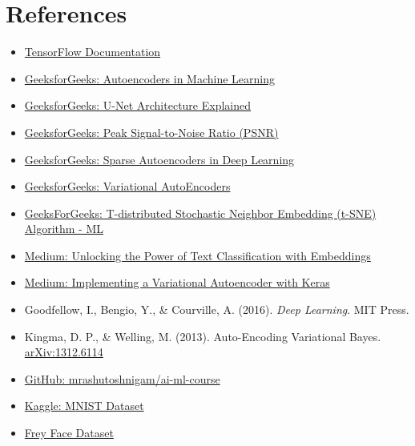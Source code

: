 \documentclass[12pt]{article}
\begin{document}
	\section{References}
	\begin{itemize}
		\item \href{https://www.tensorflow.org}{TensorFlow Documentation}
		\item \href{https://www.geeksforgeeks.org/machine-learning/auto-encoders/}{GeeksforGeeks: Autoencoders in Machine Learning}
		\item 
		\href{https://www.geeksforgeeks.org/machine-learning/u-net-architecture-explained/}{GeeksforGeeks: U-Net Architecture Explained}
		\item 
		\href{https://www.geeksforgeeks.org/python/python-peak-signal-to-noise-ratio-psnr/}{GeeksforGeeks: Peak Signal-to-Noise Ratio (PSNR)}
		\item 
		\href{https://www.geeksforgeeks.org/deep-learning/sparse-autoencoders-in-deep-learning/}{GeeksforGeeks: Sparse Autoencoders in Deep Learning}
		\item 
		\href{https://www.geeksforgeeks.org/machine-learning/variational-autoencoders/}{GeeksforGeeks: Variational AutoEncoders}
		\item 
		\href{https://www.geeksforgeeks.org/machine-learning/ml-t-distributed-stochastic-neighbor-embedding-t-sne-algorithm/}{GeeksForGeeks: T-distributed Stochastic Neighbor Embedding (t-SNE) Algorithm - ML}
		\item
		\href{https://medium.com/@juanc.olamendy/unlocking-the-power-of-text-classification-with-embeddings-7bcbb5912790}{Medium: Unlocking the Power of Text Classification with Embeddings}
		\item \href{https://medium.com/h7w/implementing-a-variational-autoencoder-with-keras-e19d7140ad90}{Medium: Implementing a Variational Autoencoder with Keras}
		\item Goodfellow, I., Bengio, Y., \& Courville, A. (2016). \textit{Deep Learning}. MIT Press.
		\item Kingma, D. P., \& Welling, M. (2013). Auto-Encoding Variational Bayes. \href{https://arxiv.org/abs/1312.6114}{arXiv:1312.6114}
		\item \href{https://github.com/mrashutoshnigam/ai-ml-course/blob/main/DeepLearning_GeeksForGeeks/Programming_Assignment/q1%20copy.ipynb}{GitHub: mrashutoshnigam/ai-ml-course}
		\item \href{https://www.kaggle.com/datasets/zalando-research/mnist}{Kaggle: MNIST Dataset}
		\item \href{https://cs.nyu.edu/roweis/data/frey_rawface.mat}{Frey Face Dataset}
	\end{itemize}
	
\end{document}
